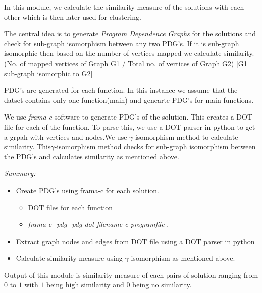     In this module, we calculate the similarity measure of the solutions with each other which is then later used for clustering.
    
    The central idea is to generate \textit{Program Dependence Graphs} \cite{PDG} for the solutions and check for sub-graph isomorphism between any two PDG's. If it is sub-graph isomorphic then based on the number of vertices mapped we calculate similarity. (No. of mapped vertices of Graph G1 / Total no. of vertices of Graph G2) [G1 sub-graph isomorphic to G2]

    PDG's are generated for each function. In this instance we assume that the datset contains only one function(main) and genearte PDG's for main functions. %
    
    We use \textit{frama-c} software to generate PDG's of the solution. This creates a DOT file for each of the function. To parse this, we use a DOT parser in python to get a grpah with vertices and nodes.We use $\gamma$-isomorphism method to calculate similarity. This$\gamma$-isomorphism method checks for sub-graph isomorphism between the PDG's and calculates similarity as mentioned above.  
    
\textit{Summary:}
\begin{itemize}
    \item Create PDG's using frama-c for each solution.
        \begin{itemize}
            \item DOT files for each function
            \item \textit{frama-c -pdg -pdg-dot filename c-programfile }.
        \end{itemize}
    \item Extract graph nodes and edges from DOT file using a DOT parser in python
    \item Calculate similarity measure using $\gamma$-isomorphism as mentioned above.
\end{itemize}

Output of this module is similarity measure of each pairs of solution ranging from $0$ to $1$ with $1$ being high similarity and 0 being no similarity.


